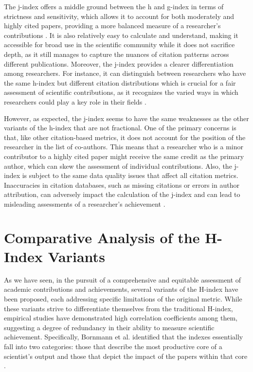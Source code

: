The j-index offers a middle ground between the h and g-index in terms of
strictness and sensitivity, which allows it to account for both moderately and
highly cited papers, providing a more balanced measure of a researcher's
contributions \cite{mikhailov2014new}. It is also relatively easy to calculate
and understand, making it accessible for broad use in the scientific community
while it does not sacrifice depth, as it still manages to capture the nuances
of citation patterns across different publications. Moreover, the j-index
provides a clearer differentiation among researchers. For instance, it can
distinguish between researchers who have the same h-index but different
citation distributions which is crucial for a fair assessment of scientific
contributions, as it recognizes the varied ways in which researchers could play
a key role in their fields \cite{mikhailov2014new}.

However, as expected, the j-index seems to have the same weaknesses as the
other variants of the h-index that are not fractional. One of the primary
concerns is that, like other citation-based metrics, it does not account for
the position of the researcher in the list of co-authors. This means that a
researcher who is a minor contributor to a highly cited paper might receive the
same credit as the primary author, which can skew the assessment of individual
contributions. Also, the j-index is subject to the same data quality issues
that affect all citation metrics. Inaccuracies in citation databases, such as
missing citations or errors in author attribution, can adversely impact the
calculation of the j-index and can lead to misleading assessments of a
researcher’s achievement \cite{mikhailov2014new}.

\section{Comparative Analysis of the H-Index Variants}
As we have seen, in the pursuit of a comprehensive and equitable assessment of
academic contributions and achievements, several variants of the H-index have
been proposed, each addressing specific limitations of the original metric.
While these variants strive to differentiate themselves from the traditional
H-index, empirical studies have demonstrated high correlation coefficients
among them, suggesting a degree of redundancy in their ability to measure
scientific achievement. Specifically, Bornmann et al. identified that the
indexes essentially fall into two categories: those that describe the most
productive core of a scientist’s output and those that depict the impact of the
papers within that core \cite{bornmann2008are, bornmann2011multilevel}.

